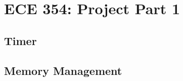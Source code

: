 \documentclass[oneside]{article}
\begin{document}
\section*{ECE 354: Project Part 1}

\subsection*{Timer}

\subsection*{Memory Management}
\end{document}

